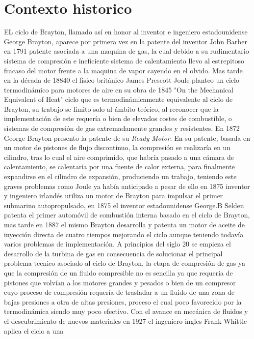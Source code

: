 \documentclass{article}
\begin{document}
\section*{Contexto historico}
EL ciclo de Brayton, llamado así en honor al inventor e ingeniero estadounidense 
George Brayton,
aparece por primera vez en la patente del inventor John Barber en 1791 patente asociada
a una maquina de gas, la cual debido a su rudimentario sistema de compresión e 
ineficiente sistema de calentamiento llevo al estrepitoso fracaso del motor frente
a la maquina de vapor cayendo en el olvido.
Mas tarde en la década de 18840 el físico británico James Prescott Joule 
planteo un ciclo termodinámico para motores de aire en su obra de 1845
"On the Mechanical Equivalent of Heat" ciclo que es termodinámicamente equivalente al 
ciclo de Brayton, su trabajo se limito solo al ámbito teórico, al reconocer que 
la implementación de este requería o bien de elevados costes de combustible, o
sistemas de compresión de gas extremadamente grandes y resistentes.
En 1872 George Brayton presento la patente de su \textit{Ready Motor}.
En su patente, basada en un motor de pistones de flujo discontinuo, 
la compresión se realizaría en un cilindro, tras lo cual el aire comprimido, 
que habría pasado a una cámara de calentamiento, se calentaría por una fuente de 
calor externa, para finalmente expandirse en el cilindro de expansión, produciendo 
un trabajo, teniendo este graves problemas como Joule ya había anticipado a pesar de ello
en 1875 inventor y ingeniero irlandés utiliza un motor de Brayton para impulsar el primer 
submarino autopropulsado,
en 1875 el inventor estadounidense George.B Selden patenta el primer automóvil
de combustión interna basado en el ciclo de Brayton, mas tarde en 1887 el mismo Brayton
desarrolla y patenta un motor de aceite de inyección directa de cuatro tiempos mejorando
el ciclo aunque teniendo todavía varios problemas de implementación. A principios del
siglo 20 se empieza el desarrollo de la turbina de gas en consecuencia de solucionar
el principal problema tecnico asociado al ciclo de Brayton, la etapa de compresión de
gas ya que la compresión de un fluido compresible no es sencilla ya que 
requería de pistones que volvían a los motores grandes y pesados o bien de 
un compresor cuyo proceso de compresión requería de trasladar a un fluido de una zona 
de bajas presiones a otra de altas presiones, proceso el cual poco favorecido por la 
termodinámica siendo muy poco efectivo.
Con el avance en mecánica de fluidos y el descubrimiento de nuevos materiales 
en 1927 el ingeniero ingles Frank Whittle  aplica el ciclo a una
\end{document}
